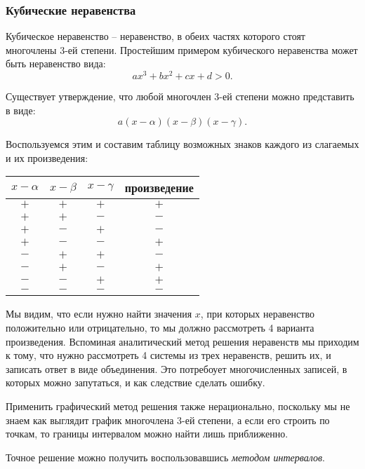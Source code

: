 \documentclass[algebra,twocolumn]{pum}
\date{16.04.20}
\begin{document}
\subsubsection*{Кубические неравенства}
Кубическое неравенство -- неравенство, в обеих частях которого стоят многочлены 3-ей степени. Простейшим примером кубического неравенства может быть неравенство вида: $$ax^3+bx^2+cx+d>0.$$

Существует утверждение, что любой многочлен 3-ей степени можно представить в виде: $$a(x-\alpha)(x-\beta)(x-\gamma).$$

Воспользуемся этим и составим таблицу возможных знаков каждого из слагаемых и их произведения:
\begin{table}[h]
  \centering
  \begin{tabular}{c|c|c||c}
    $x-\alpha$ & $x-\beta$ & $x-\gamma$ & произведение \\
    \hline
    $+$ & $+$ & $+$ & $+$ \\
    $+$ & $+$ & $-$ & $-$ \\
    $+$ & $-$ & $+$ & $-$ \\
    $+$ & $-$ & $-$ & $+$ \\
    $-$ & $+$ & $+$ & $-$ \\
    $-$ & $+$ & $-$ & $+$ \\
    $-$ & $-$ & $+$ & $+$ \\
    $-$ & $-$ & $-$ & $-$ \\
  \end{tabular}
\end{table}

Мы видим, что если нужно найти значения $x$, при которых неравенство положительно или отрицательно, то мы должно рассмотреть 4 варианта произведения. Вспоминая аналитический метод решения неравенств мы приходим к тому, что нужно рассмотреть 4 системы из трех неравенств, решить их, и записать ответ в виде объединения. Это потребоует многочисленных записей, в которых можно запутаться, и как следствие сделать ошибку.

Применить графический метод решения также нерационально, поскольку мы не знаем как выглядит график многочлена 3-ей степени, а если его строить по точкам, то границы интервалом можно найти лишь приближенно.

Точное решение можно получить воспользовавшись \emph{методом интервалов}.
\end{document}
